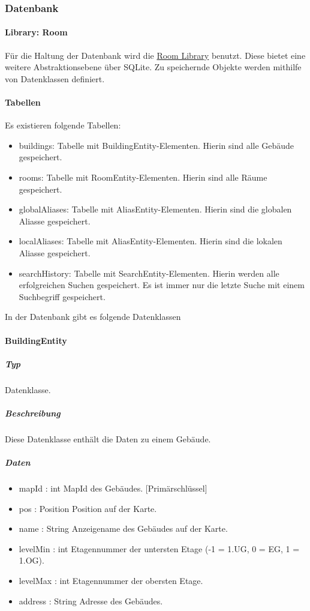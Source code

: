 \subsubsection{Datenbank}
\paragraph{Library: Room}
Für die Haltung der Datenbank wird die \href{https://developer.android.com/training/data-storage/room}
{Room Library} benutzt. Diese bietet eine weitere Abstraktionsebene über SQLite.
Zu speichernde Objekte werden mithilfe von Datenklassen definiert.

\paragraph{Tabellen}
Es existieren folgende Tabellen:
\begin{itemize}
    \item buildings: Tabelle mit BuildingEntity-Elementen. Hierin sind alle Gebäude gespeichert.
    \item rooms: Tabelle mit RoomEntity-Elementen. Hierin sind alle Räume gespeichert.
    \item globalAliases: Tabelle mit AliasEntity-Elementen. Hierin sind die globalen Aliasse gespeichert.
    \item localAliases: Tabelle mit AliasEntity-Elementen. Hierin sind die lokalen Aliasse gespeichert.
    \item searchHistory: Tabelle mit SearchEntity-Elementen. Hierin werden alle erfolgreichen Suchen gespeichert. 
    Es ist immer nur die letzte Suche mit einem Suchbegriff gespeichert.
\end{itemize}

In der Datenbank gibt es folgende Datenklassen

\paragraph{BuildingEntity}
\subparagraph*{Typ}
Datenklasse.
\subparagraph*{Beschreibung}
Diese Datenklasse enthält die Daten zu einem Gebäude.
\subparagraph*{Daten}
\begin{itemize}
    \item mapId : int MapId des Gebäudes. [Primärschlüssel]
    \item pos : Position Position auf der Karte.
    \item name : String Anzeigename des Gebäudes auf der Karte.
    \item levelMin : int Etagennummer der untersten Etage (-1 = 1.UG, 0 = EG, 1 = 1.OG).
    \item levelMax : int Etagennummer der obersten Etage.
    \item address : String Adresse des Gebäudes.
\end{itemize}


